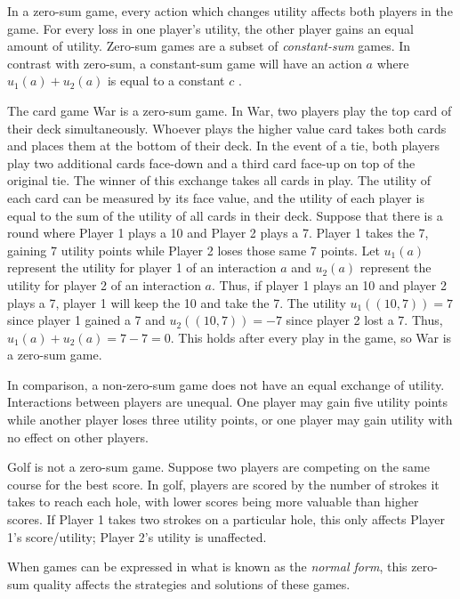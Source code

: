 In a zero-sum game, every action which changes utility affects both players in the game. For every loss in one player's utility, the other player gains an equal amount of utility. Zero-sum games are a subset of \textit{constant-sum} games. In contrast with zero-sum, a constant-sum game will have an action $a$ where $u_1(a)+u_2(a)$ is equal to a constant $c$ \cite{shoh09}.

\begin{exmp}
  The card game War is a zero-sum game. In War, two players play the top card of their deck simultaneously. Whoever plays the higher value card takes both cards and places them at the bottom of their deck. In the event of a tie, both players play two additional cards face-down and a third card face-up on top of the original tie. The winner of this exchange takes all cards in play. The utility of each card can be measured by its face value, and the utility of each player is equal to the sum of the utility of all cards in their deck. Suppose that there is a round where Player 1 plays a 10 and Player 2 plays a 7. Player 1 takes the 7, gaining 7 utility points while Player 2 loses those same 7 points. Let $u_1(a)$ represent the utility for player 1 of an interaction $a$ and $u_2(a)$ represent the utility for player 2 of an interaction $a$. Thus, if player 1 plays an 10 and player 2 plays a 7, player 1 will keep the 10 and take the 7. The utility $u_1((10, 7))=7$ since player 1 gained a 7 and $u_2((10, 7))=-7$ since player 2 lost a 7. Thus, $u_1(a)+u_2(a)=7-7=0$. This holds after every play in the game, so War is a zero-sum game.
\end{exmp}

In comparison, a non-zero-sum game does not have an equal exchange of utility. Interactions between players are unequal. One player may gain five utility points while another player loses three utility points, or one player may gain utility with no effect on other players.

\begin{exmp}
  Golf is not a zero-sum game. Suppose two players are competing on the same course for the best score. In golf, players are scored by the number of strokes it takes to reach each hole, with lower scores being more valuable than higher scores. If Player 1 takes two strokes on a particular hole, this only affects Player 1's score/utility; Player 2's utility is unaffected.
\end{exmp}

When games can be expressed in what is known as the \textit{normal form}, this zero-sum quality affects the strategies and solutions of these games.
\newpage
